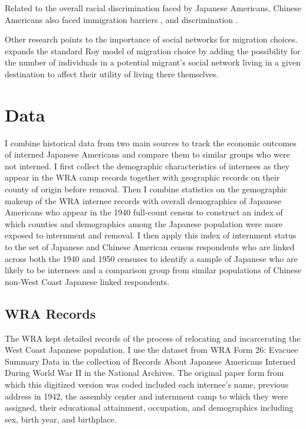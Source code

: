 \documentclass[12pt]{article}
\begin{document}
Related to the overall racial discrimination faced by Japanese Americans,
Chinese Americans also faced immigration barriers
\citep{chenImpactSkillBasedImmigration2015},
and discrimination
\citep{chenInstitutionalDiscriminationAssimilation2024}.


Other research points to the importance of social networks for migration choices.
\citep{munshiSocialNetworksMigration2020}
expands the standard Roy model of migration choice
\citep{royThoughtsDistributionEarnings1951}
by adding the possibility for the number of individuals in a potential migrant's
social network living in a given destination to affect their utility
of living there themselves.
\section{Data}
\label{sec:org4e10131}
I combine historical data from two main sources
to track the economic outcomes of interned Japanese Americans
and compare them to similar groups who were not interned.
I first collect the demographic characteristics of internees
as they appear in the WRA camp records
together with geographic records on their county of origin before removal.
Then I combine statistics on the gemographic makeup of the WRA internee records
with overall demographics of Japanese Americans who appear in the 1940 full-count census
to construct an index of which counties and demographics among the Japanese population were more exposed to internment and removal.
I then apply this index of internment status to the set of Japanese and Chinese American census respondents who are linked across both the 1940 and 1950 censuses
to identify a sample of Japanese who are likely to be internees
and a comparison group from similar populations of Chinese non-West Coast Japanese linked respondents.
\subsection{WRA Records}
\label{sec:org3fee6d9}

The WRA kept detailed records of the process of relocating and incarcerating
the West Coast Japanese population.
I use the dataset from WRA Form 26: Evacuee Summary Data in the collection of
Records About Japanese Americans Interned During World War II
in the National Archives.
The original paper form from which this digitized version was coded
included each internee's name, previous address in 1942,
the assembly center and internment camp to which they were assigned,
their educational attainment, occupation,
and demographics including sex, birth year, and birthplace.
\end{document}
